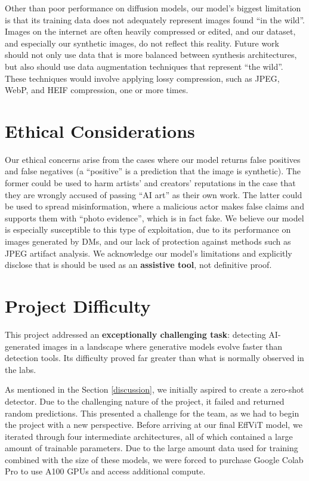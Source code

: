 \documentclass{article} %
\begin{document}
Other than poor performance on diffusion models, our model's biggest limitation is that its training data does not adequately represent images found ``in the wild''. Images on the internet are often heavily compressed or edited, and our dataset, and especially our synthetic images, do not reflect this reality. Future work should not only use data that is more balanced between synthesis architectures, but also should use data augmentation techniques that represent ``the wild''. These techniques would involve applying lossy compression, such as JPEG, WebP, and HEIF compression, one or more times.

\section{Ethical Considerations}

Our ethical concerns arise from the cases where our model returns false positives and false negatives (a ``positive'' is a prediction that the image is synthetic). The former could be used to harm artists' and creators' reputations in the case that they are wrongly accused of passing ``AI art'' as their own work. The latter could be used to spread misinformation, where a malicious actor makes false claims and supports them with ``photo evidence'', which is in fact fake. We believe our model is especially susceptible to this type of exploitation, due to its performance on images generated by DMs, and our lack of protection against methods such as JPEG artifact analysis. We acknowledge our model's limitations and explicitly disclose that is should be used as an \textbf{assistive tool}, not definitive proof.

\section{Project Difficulty}

This project addressed an \textbf{exceptionally challenging task}: detecting AI-generated images in a landscape where generative models evolve faster than detection tools. Its difficulty proved far greater than what is normally observed in the labs.

As mentioned in the Section \ref{discussion}, we initially aspired to create a zero-shot detector. Due to the challenging nature of the project, it failed and returned random predictions. This presented a challenge for the team, as we had to begin the project with a new perspective. Before arriving at our final EffViT model, we iterated through four intermediate architectures, all of which contained a large amount of trainable parameters. Due to the large amount data used for training combined with the size of these models, we were forced to purchase Google Colab Pro to use A100 GPUs and access additional compute.
\end{document}
